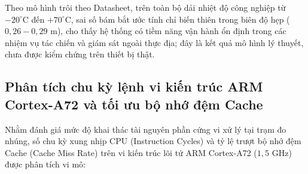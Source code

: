 Theo mô hình trôi theo Datasheet, trên toàn bộ dải nhiệt độ công nghiệp từ $-20^\circ\text{C}$ đến $+70^\circ\text{C}$, sai số bám bắt ước tính chỉ biến thiên trong biên độ hẹp ($0{,}26 - 0{,}29$ m), cho thấy hệ thống có tiềm năng vận hành ổn định trong các nhiệm vụ tác chiến và giám sát ngoài thực địa; đây là kết quả mô hình lý thuyết, chưa được kiểm chứng trên thiết bị thật.

\subsection{Phân tích chu kỳ lệnh vi kiến trúc ARM Cortex-A72 và tối ưu bộ nhớ đệm Cache}

\hspace{0.5cm} Nhằm đánh giá mức độ khai thác tài nguyên phần cứng vi xử lý tại trạm đo nhúng, số chu kỳ xung nhịp CPU (Instruction Cycles) và tỷ lệ trượt bộ nhớ đệm Cache (Cache Miss Rate) trên vi kiến trúc lõi tứ ARM Cortex-A72 ($1{,}5$ GHz) được phân tích vi mô:

\begin{table}[H]
\centering
\caption{Phân tích lý thuyết số chu kỳ xung nhịp CPU và ước lượng hiệu năng bộ nhớ đệm L1/L2}
\label{tab:arm-cortex-a72-microarchitecture-metrics}
\end{table}

